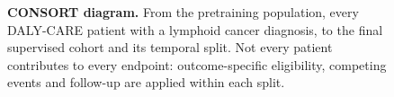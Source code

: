 \documentclass[11pt]{article}
\newcommand{\indextableref}{table of prognostic indices}
\begin{document}
\renewcommand{\cref}[1]{\indextableref}
  {}
  {}
\clearpage
\begin{figure}[p]
\centering
\resizebox{!}{0.84\textheight}{}
\caption{\textbf{CONSORT diagram.} From the pretraining population, every DALY-CARE
patient with a lymphoid cancer diagnosis, to the final supervised cohort and its
temporal split. Not every patient contributes to
every endpoint: outcome-specific eligibility, competing events and follow-up are
applied within each split.}
\label{fig:consort}
\end{figure}
\end{document}
